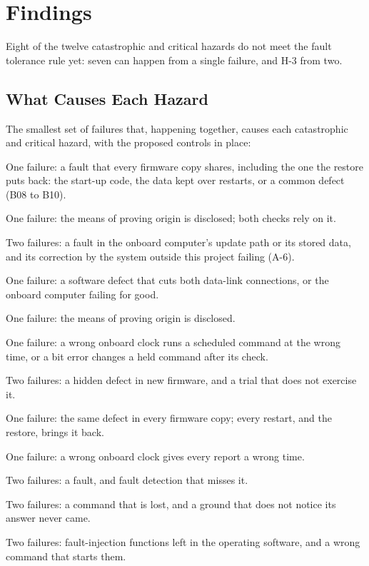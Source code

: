 \documentclass[11pt,a4paper]{article}
\begin{document}
\section{Findings}
Eight of the twelve catastrophic and critical hazards do not meet the fault
tolerance rule yet: seven can happen from a single failure, and H-3 from two.

\subsection{What Causes Each Hazard}
The smallest set of failures that, happening together, causes each
catastrophic and critical hazard, with the proposed controls in place:
\begin{description}[leftmargin=1.4cm]
\item[H-1] One failure: a fault that every firmware copy shares, including the
  one the restore puts back: the start-up code, the data kept over restarts, or
  a common defect (B08 to B10).
\item[H-2] One failure: the means of proving origin is disclosed; both checks
  rely on it.
\item[H-3] Two failures: a fault in the onboard computer's update path or its
  stored data, and its correction by the system outside this project failing
  (A-6).
\item[H-4] One failure: a software defect that cuts both data-link
  connections, or the onboard computer failing for good.
\item[H-5] One failure: the means of proving origin is disclosed.
\item[H-6] One failure: a wrong onboard clock runs a scheduled command at the
  wrong time, or a bit error changes a held command after its check.
\item[H-7] Two failures: a hidden defect in new firmware, and a trial that does
  not exercise it.
\item[H-8] One failure: the same defect in every firmware copy; every restart,
  and the restore, brings it back.
\item[H-9] One failure: a wrong onboard clock gives every report a wrong time.
\item[H-10] Two failures: a fault, and fault detection that misses it.
\item[H-11] Two failures: a command that is lost, and a ground that does not
  notice its answer never came.
\item[H-12] Two failures: fault-injection functions left in the operating
  software, and a wrong command that starts them.
\end{description}
\end{document}
